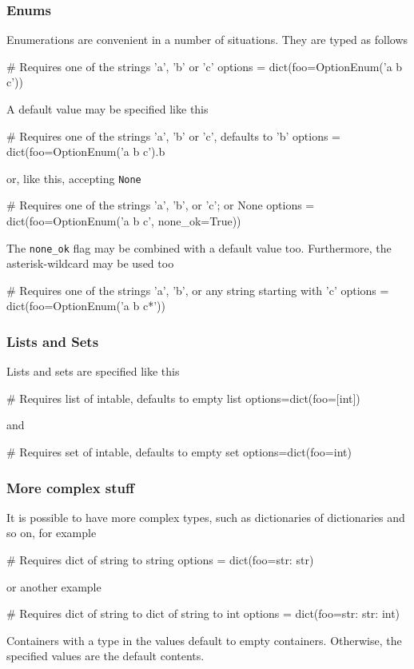 \subsubsection*{Enums}
Enumerations are convenient in a number of situations.  They are typed
as follows
\begin{pythonBEG}
  # Requires one of the strings 'a', 'b' or 'c'
  options = dict(foo=OptionEnum('a b c'))
\end{pythonBEG}
A default value may be specified like this
\begin{pythonMID}
   # Requires one of the strings 'a', 'b' or 'c', defaults to 'b'
  options = dict(foo=OptionEnum('a b c').b
\end{pythonMID}
or, like this, accepting \texttt{None}
\begin{pythonMID}
  # Requires one of the strings 'a', 'b', or 'c'; or None
  options = dict(foo=OptionEnum('a b c', none_ok=True))
\end{pythonMID}
The \texttt{none\_ok} flag may be combined with a default value too.
Furthermore, the asterisk-wildcard may be used too
\begin{pythonEND}
  # Requires one of the strings 'a', 'b', or any string starting with 'c'
  options = dict(foo=OptionEnum('a b c*'))
\end{pythonEND}



\subsubsection*{Lists and Sets}
Lists and sets are specified like this
\begin{pythonBEG}
  # Requires list of intable, defaults to empty list
  options=dict(foo=[int])
\end{pythonBEG}
and
\begin{pythonEND}
  # Requires set of intable, defaults to empty set
  options=dict(foo={int})
\end{pythonEND}



\subsubsection*{More complex stuff}
It is possible to have more complex types, such as dictionaries of
dictionaries and so on, for example
\begin{pythonBEG}
  # Requires dict of string to string
  options = dict(foo={str: str})
\end{pythonBEG}
or another example
\begin{pythonEND}
  # Requires dict of string to dict of string to int
  options = dict(foo={str: {str: int}})
\end{pythonEND}
Containers with a type in the values default to empty containers.
Otherwise, the specified values are the default contents.



